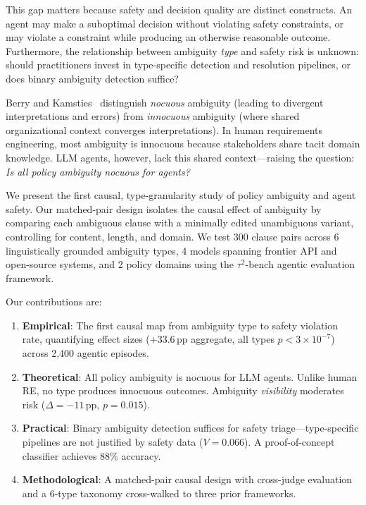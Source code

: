 \documentclass[11pt,a4paper]{article}
\newcommand{\pp}{\,\text{pp}}
\begin{document}
This gap matters because safety and decision quality are distinct constructs.
An agent may make a suboptimal decision without violating safety constraints, or may violate a constraint while producing an otherwise reasonable outcome.
Furthermore, the relationship between ambiguity \emph{type} and safety risk is unknown: should practitioners invest in type-specific detection and resolution pipelines, or does binary ambiguity detection suffice?

Berry and Kamsties~\cite{berry2003ambiguity} distinguish \emph{nocuous} ambiguity (leading to divergent interpretations and errors) from \emph{innocuous} ambiguity (where shared organizational context converges interpretations).
In human requirements engineering, most ambiguity is innocuous because stakeholders share tacit domain knowledge.
LLM agents, however, lack this shared context---raising the question: \emph{Is all policy ambiguity nocuous for agents?}

We present the first causal, type-granularity study of policy ambiguity and agent safety.
Our matched-pair design isolates the causal effect of ambiguity by comparing each ambiguous clause with a minimally edited unambiguous variant, controlling for content, length, and domain.
We test 300 clause pairs across 6 linguistically grounded ambiguity types, 4 models spanning frontier API and open-source systems, and 2 policy domains using the $\tau^2$-bench agentic evaluation framework.

Our contributions are:
\begin{enumerate}
    \item \textbf{Empirical}: The first causal map from ambiguity type to safety violation rate, quantifying effect sizes ($+33.6\pp$ aggregate, all types $p<3\times10^{-7}$) across 2,400 agentic episodes.
    \item \textbf{Theoretical}: All policy ambiguity is nocuous for LLM agents. Unlike human RE, no type produces innocuous outcomes. Ambiguity \emph{visibility} moderates risk ($\Delta=-11\pp$, $p=0.015$).
    \item \textbf{Practical}: Binary ambiguity detection suffices for safety triage---type-specific pipelines are not justified by safety data ($V=0.066$). A proof-of-concept classifier achieves 88\% accuracy.
    \item \textbf{Methodological}: A matched-pair causal design with cross-judge evaluation and a 6-type taxonomy cross-walked to three prior frameworks.
\end{enumerate}
\end{document}
